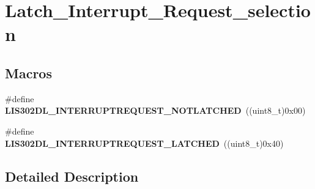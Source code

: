 \hypertarget{group__latch___interrupt___request__selection}{\section{Latch\-\_\-\-Interrupt\-\_\-\-Request\-\_\-selection}
\label{group__latch___interrupt___request__selection}
}
\subsection*{Macros}
\begin{DoxyCompactItemize}
\item 
\hypertarget{group__latch___interrupt___request__selection_ga474b8426a45808f4deed88dc85ac9410}{\#define {\bfseries L\-I\-S302\-D\-L\-\_\-\-I\-N\-T\-E\-R\-R\-U\-P\-T\-R\-E\-Q\-U\-E\-S\-T\-\_\-\-N\-O\-T\-L\-A\-T\-C\-H\-E\-D}~((uint8\-\_\-t)0x00)}\label{group__latch___interrupt___request__selection_ga474b8426a45808f4deed88dc85ac9410}

\item 
\hypertarget{group__latch___interrupt___request__selection_ga2aa8314784a0c595e240e1db9b66745d}{\#define {\bfseries L\-I\-S302\-D\-L\-\_\-\-I\-N\-T\-E\-R\-R\-U\-P\-T\-R\-E\-Q\-U\-E\-S\-T\-\_\-\-L\-A\-T\-C\-H\-E\-D}~((uint8\-\_\-t)0x40)}\label{group__latch___interrupt___request__selection_ga2aa8314784a0c595e240e1db9b66745d}

\end{DoxyCompactItemize}


\subsection{Detailed Description}

